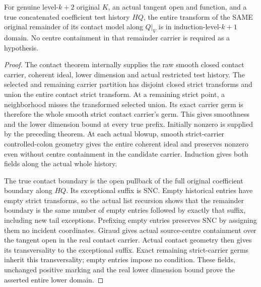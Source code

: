 \begin{theorem}
\label{hir:original-all-level-contact-test-remainder-domain}
\leanok
{}
For genuine level-$k+2$ original $K$, an actual tangent open and function,
and a true concatenated coefficient test history $H Q$, the entire transform
of the SAME original remainder of its contact model along $Q|_V$ is in
induction-level-$k+1$ domain. No centre containment in that remainder carrier
is required as a hypothesis.
\end{theorem}
\begin{proof}
The contact theorem internally supplies the raw smooth closed contact carrier,
coherent ideal, lower dimension and actual restricted test history. The selected
and remaining carrier partition has disjoint closed strict transforms and union
the entire contact strict transform. At a remaining strict point, a neighborhood
misses the transformed selected union. Its exact carrier germ is therefore the
whole smooth strict contact carrier's germ. This gives smoothness and the lower
dimension bound at every true prefix. Initially nonzero is supplied by the
preceding theorem. At each actual blowup, smooth strict-carrier controlled-colon
geometry gives the entire coherent ideal and preserves nonzero even without
centre containment in the candidate carrier. Induction gives both fields along
the actual whole history.

The true contact boundary is the open pullback of the full original coefficient
boundary along $H Q$. Its exceptional suffix is SNC. Empty historical entries
have empty strict transforms, so the actual list recursion shows that the
remainder boundary is the same number of empty entries followed by exactly that
suffix, including new tail exceptions. Prefixing empty entries preserves SNC
by assigning them no incident coordinates. Giraud gives actual source-centre
containment over the tangent open in the real contact carrier. Actual contact
geometry then gives its transversality to the exceptional suffix. Exact
remaining strict-carrier germs inherit this transversality; empty entries impose
no condition. These fields, unchanged positive marking and the real lower
dimension bound prove the asserted entire lower domain.
\end{proof}

